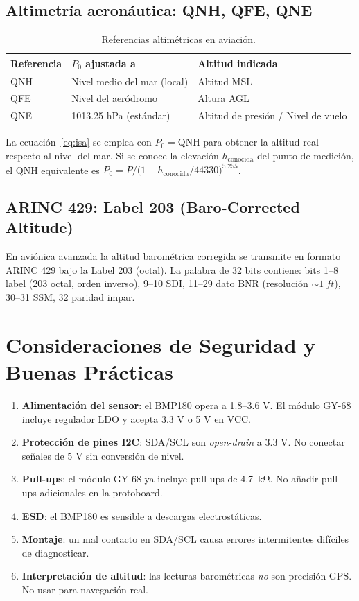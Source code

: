 \documentclass[11pt]{article}
\begin{document}
\subsection{Altimetría aeronáutica: QNH, QFE, QNE}
\begin{table}[H]\centering
\caption{Referencias altimétricas en aviación.}
\begin{tabular}{lll}
\toprule
Referencia & $P_0$ ajustada a & Altitud indicada \\
\midrule
QNH & Nivel medio del mar (local) & Altitud MSL \\
QFE & Nivel del aeródromo & Altura AGL \\
QNE & 1013.25 hPa (estándar) & Altitud de presión / Nivel de vuelo \\
\bottomrule
\end{tabular}
\end{table}
La ecuación~\eqref{eq:isa} se emplea con $P_0 = \text{QNH}$ para obtener la altitud real
respecto al nivel del mar. Si se conoce la elevación $h_\text{conocida}$ del punto de
medición, el QNH equivalente es
$P_0 = P / \bigl(1 - h_\text{conocida}/\num{44330}\bigr)^{5.255}$.

\subsection{ARINC 429: Label 203 (Baro-Corrected Altitude)}
En aviónica avanzada la altitud barométrica corregida se transmite en formato ARINC 429
bajo la Label 203 (octal). La palabra de 32 bits contiene: bits 1--8 label (203 octal,
orden inverso), 9--10 SDI, 11--29 dato BNR (resolución $\sim\SI{1}{ft}$), 30--31 SSM,
32 paridad impar.

\section{Consideraciones de Seguridad y Buenas Prácticas}
\begin{enumerate}
  \item \textbf{Alimentación del sensor}: el BMP180 opera a 1.8--3.6 V. El módulo GY-68
        incluye regulador LDO y acepta 3.3 V o 5 V en VCC.
  \item \textbf{Protección de pines I2C}: SDA/SCL son \emph{open-drain} a 3.3 V. No
        conectar señales de 5 V sin conversión de nivel.
  \item \textbf{Pull-ups}: el módulo GY-68 ya incluye pull-ups de \SI{4.7}{\kilo\ohm}. No
        añadir pull-ups adicionales en la protoboard.
  \item \textbf{ESD}: el BMP180 es sensible a descargas electrostáticas.
  \item \textbf{Montaje}: un mal contacto en SDA/SCL causa errores intermitentes
        difíciles de diagnosticar.
  \item \textbf{Interpretación de altitud}: las lecturas barométricas \emph{no} son
        precisión GPS. No usar para navegación real.
\end{enumerate}
\end{document}

